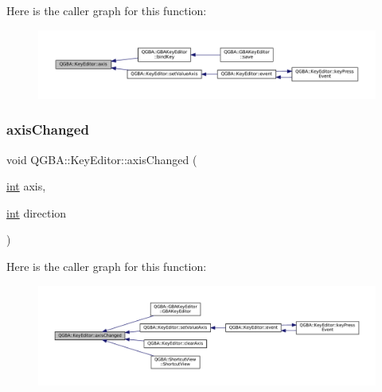 Here is the caller graph for this function\+:
\nopagebreak
\begin{figure}[H]
\begin{center}
\leavevmode
\includegraphics[width=350pt]{class_q_g_b_a_1_1_key_editor_aed1e594b4662a661a9b5d111c9fa5ab9_icgraph}
\end{center}
\end{figure}
\mbox{\label{class_q_g_b_a_1_1_key_editor_a3fb5151c9ce4c79fb6cec76021bb13ab}} 
\subsubsection{\texorpdfstring{axis\+Changed}{axisChanged}}
{\footnotesize\ttfamily void Q\+G\+B\+A\+::\+Key\+Editor\+::axis\+Changed (\begin{DoxyParamCaption}\item[{\mbox{\hyperlink{ioapi_8h_a787fa3cf048117ba7123753c1e74fcd6}{int}}}]{axis,  }\item[{\mbox{\hyperlink{ioapi_8h_a787fa3cf048117ba7123753c1e74fcd6}{int}}}]{direction }\end{DoxyParamCaption})\hspace{0.3cm}{\ttfamily [signal]}}

Here is the caller graph for this function\+:
\nopagebreak
\begin{figure}[H]
\begin{center}
\leavevmode
\includegraphics[width=350pt]{class_q_g_b_a_1_1_key_editor_a3fb5151c9ce4c79fb6cec76021bb13ab_icgraph}
\end{center}
\end{figure}
\mbox{\label{class_q_g_b_a_1_1_key_editor_ad813791e61eec2df461175cdf042418b}} 
